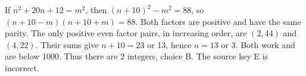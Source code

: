 If $n^2+20n+12=m^2$, then $(n+10)^2-m^2=88$, so $(n+10-m)(n+10+m)=88$. Both factors are positive and have the same parity. The only positive even factor pairs, in increasing order, are $(2,44)$ and $(4,22)$. Their sums give $n+10=23$ or 13, hence $n=13$ or 3. Both work and are below 1000. Thus there are $\boxed2$ integers, choice B. The source key E is incorrect.
